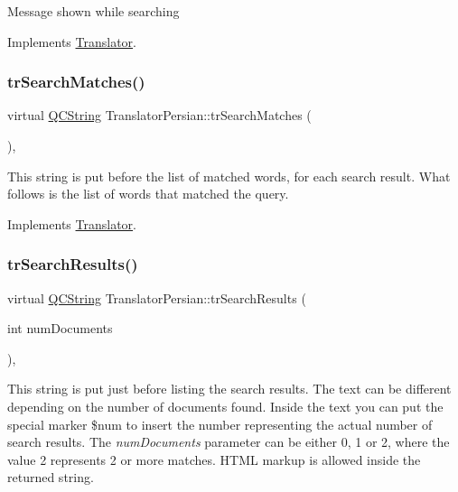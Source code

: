 Message shown while searching 

Implements \mbox{\hyperlink{class_translator}{Translator}}.

\mbox{\label{class_translator_persian_a1f7b1920aac1412ab5f5bb99e4eb8bf1}} 
\subsubsection{\texorpdfstring{trSearchMatches()}{trSearchMatches()}}
{\footnotesize\ttfamily virtual \mbox{\hyperlink{class_q_c_string}{Q\+C\+String}} Translator\+Persian\+::tr\+Search\+Matches (\begin{DoxyParamCaption}{ }\end{DoxyParamCaption})\hspace{0.3cm}{\ttfamily [inline]}, {\ttfamily [virtual]}}

This string is put before the list of matched words, for each search result. What follows is the list of words that matched the query. 

Implements \mbox{\hyperlink{class_translator}{Translator}}.

\mbox{\label{class_translator_persian_a7c30592c6e6a397917891053fd0a62f3}} 
\subsubsection{\texorpdfstring{trSearchResults()}{trSearchResults()}}
{\footnotesize\ttfamily virtual \mbox{\hyperlink{class_q_c_string}{Q\+C\+String}} Translator\+Persian\+::tr\+Search\+Results (\begin{DoxyParamCaption}\item[{int}]{num\+Documents }\end{DoxyParamCaption})\hspace{0.3cm}{\ttfamily [inline]}, {\ttfamily [virtual]}}

This string is put just before listing the search results. The text can be different depending on the number of documents found. Inside the text you can put the special marker \$num to insert the number representing the actual number of search results. The {\itshape num\+Documents} parameter can be either 0, 1 or 2, where the value 2 represents 2 or more matches. H\+T\+ML markup is allowed inside the returned string. 

